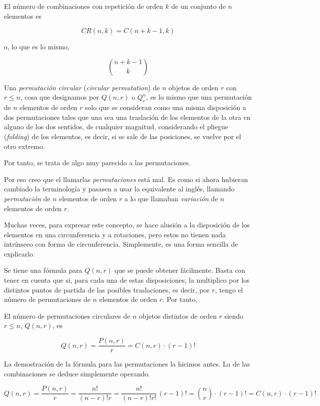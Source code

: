 \begin{corollary}
  El número de combinaciones con repetición de orden $k$ de un conjunto de
  $n$ elementos es

  $$ CR(n, k) = C(n + k - 1, k) $$

  \noindent o, lo que es lo mismo,

  $$ {n + k - 1 \choose k} $$
\end{corollary}

\begin{deffinition}
  Una \emph{permutación circular} (\emph{circular permutation}) de $n$ objetos
  de orden $r$ con $r \leq n$, cosa que designamos por $Q(n, r)$ o $Q_r^n$,
  es lo mismo que una permutación de $n$ elementos de orden $r$ solo que se
  consideran como una misma disposición a dos permutaciones tales que una
  sea una traslación de los elementos de la otra en alguno de los dos
  sentidos, de cualquier magnitud, considerando el pliegue (\emph{folding})
  de los elementos, es decir, si se sale de las posiciones, se vuelve por el
  otro extremo.
\end{deffinition}

Por tanto, se trata de algo muy parecido a las permutaciones.

Por eso creo que el llamarlas \emph{permutaciones} está mal. Es como si ahora
hubieran cambiado la terminología y pasasen a usar la equivalente al inglés,
llamando \emph{permutación} de $n$ elementos de orden $r$ a lo que llamaban
\emph{variación} de $n$ elementos de orden $r$.

Muchas veces, para expresar este concepto, se hace alusión a la disposición
de los elementos en una circunferencia y a rotaciones, pero estos no tienen
nada intrínseco con forma de circunferencia. Simplemente, es una forma
sencilla de explicarlo.

Se tiene una fórmula para $Q(n, r)$ que se puede obtener fácilmente. Basta
con tener en cuenta que si, para cada una de estas disposiciones, la
multiplico por los distintos puntos de partida de las posibles traslaciones,
es decir, por $r$, tengo el número de permutaciones de $n$ elementos de
orden $r$. Por tanto,

\begin{theorem}
  El número de permutaciones circulares de $n$ objetos distintos de orden
  $r$ siendo $r \leq n$, $Q(n, r)$, es

  $$ Q(n, r) = \frac{P(n, r)}{r} = C(n, r) \cdot (r-1)! $$
\end{theorem}

La demostración de la fórmula para las permutaciones la hicimos antes. La de
las combinaciones se deduce simplemente operando.

$$ Q(n, r) = \frac{P(n, r)}{r} = \frac{n!}{(n-r)! r} = \frac{n!}{(n-r)! r!}
\, (r-1)! = {n \choose r} \cdot (r-1)! = C(n, r) \cdot (r-1)! $$

















